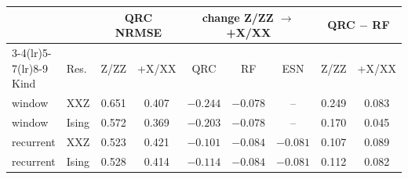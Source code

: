 \begin{tabular}{llccccccc}
\toprule
 & & \multicolumn{2}{c}{QRC NRMSE} & \multicolumn{3}{c}{change Z/ZZ $\to$ +X/XX} & \multicolumn{2}{c}{QRC $-$ RF} \\
\cmidrule(lr){3-4}\cmidrule(lr){5-7}\cmidrule(lr){8-9}
Kind & Res. & Z/ZZ & +X/XX & QRC & RF & ESN & Z/ZZ & +X/XX \\
\midrule
window & XXZ & 0.651 & 0.407 & $-0.244$ & $-0.078$ & -- & 0.249 & 0.083 \\
window & Ising & 0.572 & 0.369 & $-0.203$ & $-0.078$ & -- & 0.170 & 0.045 \\
recurrent & XXZ & 0.523 & 0.421 & $-0.101$ & $-0.084$ & $-0.081$ & 0.107 & 0.089 \\
recurrent & Ising & 0.528 & 0.414 & $-0.114$ & $-0.084$ & $-0.081$ & 0.112 & 0.082 \\
\bottomrule
\end{tabular}
